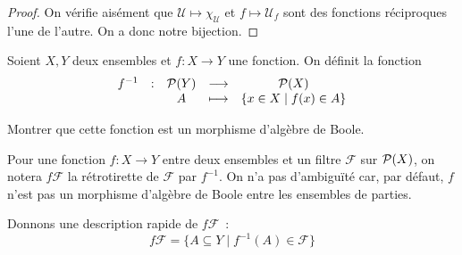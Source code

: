 \begin{proof}
  On vérifie aisément que $\mathcal U \mapsto \chi_\mathcal U$ et
  $f\mapsto \mathcal U_f$ sont des fonctions réciproques l'une de l'autre.
  On a donc notre bijection.
\end{proof}

\begin{exercise}
  Soient $X,Y$ deux ensembles et $f : X \to Y$ une fonction. On définit la
  fonction
  \[\begin{array}{ccccc}
  f^{-1} & : & \mathcal{P}(Y) & \longrightarrow & \mathcal{P}(X)\\
  & & A & \longmapsto & \{x\in X \mid f(x) \in A\}
  \end{array}\]

  Montrer que cette fonction est un morphisme d'algèbre de Boole.
\end{exercise}

\begin{notation}
  Pour une fonction $f : X \to Y$ entre deux ensembles et un filtre $\mathcal F$
  sur $\mathcal{P}(X)$, on notera $f\mathcal F$ la rétrotirette de $\mathcal F$
  par $f^{-1}$. On n'a pas d'ambiguïté car, par défaut, $f$ n'est pas un
  morphisme d'algèbre de Boole entre les ensembles de parties.

  Donnons une description rapide de $f\mathcal F$~:
  \[f\mathcal F = \{A \subseteq Y \mid f^{-1}(A) \in \mathcal F\}\]
\end{notation}
